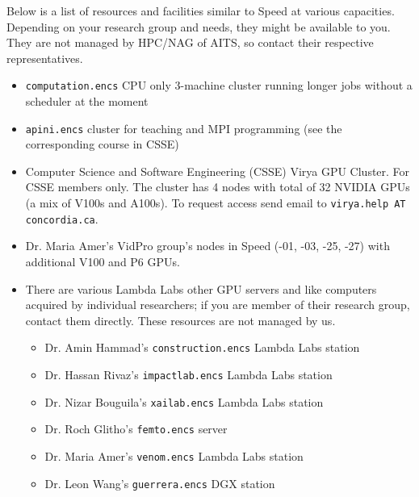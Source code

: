 
Below is a list of resources and facilities similar to Speed at various capacities.
Depending on your research group and needs, they might be available to you. They
are not managed by HPC/NAG of AITS, so contact their respective representatives.

\begin{itemize}
    \item
    \texttt{computation.encs} CPU only 3-machine cluster running longer jobs
    without a scheduler at the moment
    \item
    \texttt{apini.encs} cluster for teaching and MPI programming (see the corresponding
    course in CSSE)
    \item
    Computer Science and Software Engineering (CSSE) Virya GPU Cluster. For CSSE 
    members only. The cluster has 4 nodes with total of 32 NVIDIA GPUs (a mix of
    V100s and A100s). To request access send email to \texttt{virya.help AT concordia.ca}.
    \item
    Dr. Maria Amer's VidPro group's nodes in Speed (-01, -03, -25, -27) with additional V100 and P6 GPUs.
    \item
    There are various Lambda Labs other GPU servers and like computers
    acquired by individual researchers; if you are member of their
    research group, contact them directly. These resources are not
    managed by us.

    \begin{itemize}
        \item
        Dr. Amin Hammad's \texttt{construction.encs} Lambda Labs station
        \item
        Dr. Hassan Rivaz's \texttt{impactlab.encs} Lambda Labs station
        \item
        Dr. Nizar Bouguila's \texttt{xailab.encs} Lambda Labs station
        \item
        Dr. Roch Glitho's \texttt{femto.encs} server
        \item
        Dr. Maria Amer's \texttt{venom.encs} Lambda Labs station
        \item
        Dr. Leon Wang's \texttt{guerrera.encs} DGX station
    \end{itemize}


\end{itemize}
